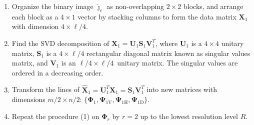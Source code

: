 \documentclass[journal]{IEEEtran}
\begin{document}
\begin{enumerate}
\item Organize the binary image $\bm{\widehat\jmath}_c$ as non-overlapping $2\times 2$ blocks, and arrange each block as a $4\times 1$ vector by stacking columns to form the data matrix $\bm X_1$ with dimension ${4\times{\ell}/{4}}$.
\item Find the SVD decomposition of $\bm X_1=\bm U_1 \bm S_1 \bm V_1^T$, where $\bm U_1$ is a ${4\times 4}$ unitary matrix, $\bm S_1$ is a $4\times{\ell}/{4}$ rectangular diagonal matrix  known as singular values matrix, and $\bm V_1$ is an ${\ell}/{4}\times{\ell}/{4}$~unitary matrix. The singular values are ordered in a decreasing order.
\item 
Transform the lines of $\widehat{\bm X}_1=\bm U_1^T\bm X_1=\bm S_1 \bm V_1^T$ into new matrices with dimensions ${m}/{2}\times{n}/{2}$: $\{\bm\Phi_1, \bm\Psi_{1\text{V}}, \bm\Psi_{1\text{H}}, \bm\Psi_{1\text{D}}\}$. 
\item Repeat the procedure (1) on $\bm\Phi_r$ by $r=2$ up to the lowest resolution level $R$. 

\end{enumerate}
\end{document}
